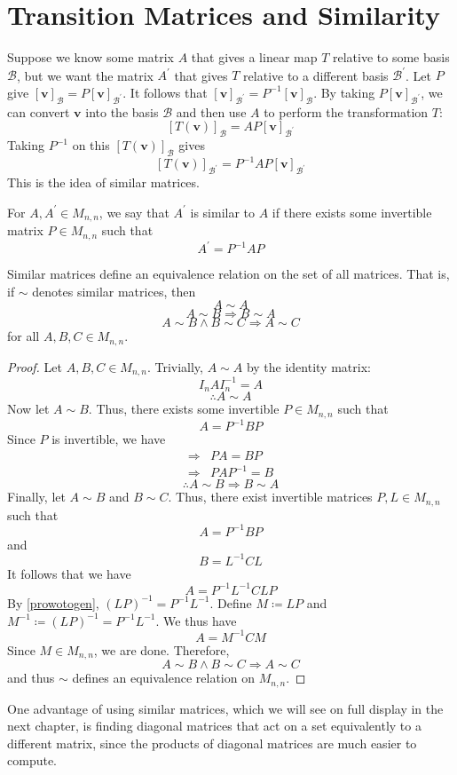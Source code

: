 \section{Transition Matrices and Similarity}
Suppose we know some matrix \(A\) that gives a linear map \(T\) relative to some basis \(\mathcal{B} \), but we want the matrix \(A^{\prime} \) that gives \(T\) relative to a different basis \(\mathcal{B} ^{\prime} \). Let \(P\) give \([\mathbf{v}]_\mathcal{B} = P[\mathbf{v}]_{\mathcal{B} ^{\prime} }\). It follows that \([\mathbf{v}]_{\mathcal{B} ^{\prime} }=P ^{-1} [\mathbf{v}]_\mathcal{B} \). By taking \(P[\mathbf{v}]_{\mathcal{B} ^{\prime} }\), we can convert \(\mathbf{v}\) into the basis \(\mathcal{B} \) and then use \(A\) to perform the transformation \(T\):
\[
    [T(\mathbf{v})]_{\mathcal{B} } = AP[\mathbf{v}]_{\mathcal{B} ^{\prime} }
\]
Taking \(P ^{-1} \) on this \([T(\mathbf{v})]_{\mathcal{B} }\) gives 
\[
    [T(\mathbf{v})]_{\mathcal{B}^{\prime}  } = P ^{-1} AP [\mathbf{v}]_{\mathcal{B} ^{\prime} }
\]
This is the idea of similar matrices.
\begin{definition}
    For \(A,A^{\prime} \in M_{n,n}\), we say that \(A^{\prime} \) is similar to \(A\) if there exists some invertible matrix \(P\in M_{n,n} \) such that 
    \[
        A^{\prime} =P ^{-1} A P
    \]
\end{definition}
\begin{theorem}
    Similar matrices define an equivalence relation on the set of all matrices. That is, if \(\sim \) denotes similar matrices, then
    \[
        A\sim A
    \] 
    \[
        A\sim B \Longrightarrow B\sim A
    \]
    \[
        A\sim B \land B\sim C \Longrightarrow A\sim C
    \]
    for all \(A,B,C\in M_{n,n}\).
\end{theorem}
\begin{proof}
    Let \(A,B,C\in M_{n,n}\). Trivially, \(A\sim A\) by the identity matrix:
    \[
        I_nAI_n^{-1} =A
    \]
    \[
        \therefore A\sim A
    \]
    Now let \(A\sim B\). Thus, there exists some invertible \(P\in M_{n,n}\) such that 
    \[
        A = P ^{-1} B P
    \]
    Since \(P\) is invertible, we have 
    \begin{align*}
        \Longrightarrow&   PA = BP\\
        \Longrightarrow& PA P ^{-1} =B
    \end{align*}
    \[
        \therefore A\sim B \Longrightarrow B\sim A
    \]
    Finally, let \(A\sim B\) and \(B\sim C\). Thus, there exist invertible matrices \(P,L\in M_{n,n}\) such that
    \[
        A = P ^{-1} BP
    \]
    and
    \[
        B = L^{-1} C L
    \]
    It follows that we have 
    \[
        A=P ^{-1} L^{-1} CLP
    \]
    By \ref{prowotogen}, \((LP)^{-1} =P ^{-1} L^{-1} \). Define \(M\coloneqq LP\) and \(M^{-1} \coloneqq (LP)^{-1} =P ^{-1} L^{-1} \). We thus have 
    \[
        A = M^{-1} CM
    \]
    Since \(M\in M_{n,n}\), we are done. Therefore, 
    \[
        A\sim B\land B\sim C\Longrightarrow A\sim C
    \]
    and thus \(\sim \) defines an equivalence relation on \(M_{n,n}\).
\end{proof}
One advantage of using similar matrices, which we will see on full display in the next chapter, is finding diagonal matrices that act on a set equivalently to a different matrix, since the products of diagonal matrices are much easier to compute.